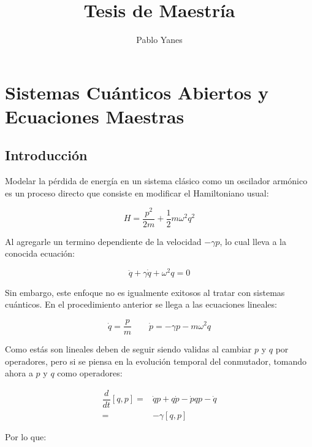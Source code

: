 \documentclass[a4paper,10pt]{report}
\title{Tesis de Maestría}
\author{Pablo Yanes}
\begin{document}
\maketitle

\begin{abstract}

\end{abstract}

\chapter{Sistemas Cuánticos Abiertos y Ecuaciones Maestras}

\section{Introducción}

Modelar la pérdida de energía en un sistema clásico como un oscilador armónico es un proceso directo \cite{CarmichaelQO} que consiste en modificar el Hamiltoniano usual:

\begin{equation}
H = \frac{p^2}{2m} + \frac{1}{2} m\omega^2 q^2
\end{equation}

Al agregarle un termino dependiente de la velocidad $-\gamma p$, lo cual lleva a la conocida ecuación:

\begin{equation}
\ddot{q} + \gamma \dot{q} + \omega^2 q = 0
\end{equation}

Sin embargo, este enfoque no es igualmente exitosos al tratar con sistemas cuánticos. En el procedimiento anterior se llega a las ecuaciones lineales:

\begin{equation}
\dot{q} = \frac{p}{m} \qquad \dot{p} = -\gamma p -m\omega ^2 q
\end{equation}

Como estás son lineales deben de seguir siendo validas al cambiar $p$ y $q$ por operadores, pero si se piensa en la evolución temporal del conmutador, tomando ahora a $p$ y $q$ como operadores:

\begin{align*}
 \dfrac{d}{dt}[q,p] =& \dot{q}p + q\dot{p} - \dot{p}q p-\dot{q}\\  
 =& -\gamma[q,p]
\end{align*}

Por lo que:
\end{document}
